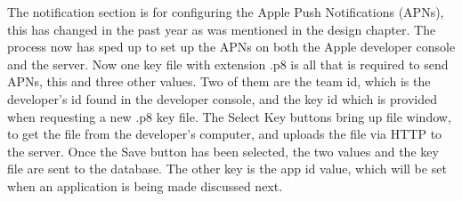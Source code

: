 The notification section is for configuring the Apple Push Notifications (APNs), this has changed in the past year as was mentioned in the design chapter. The process now has sped up to set up the APNs on both the Apple developer console and the server. Now one key file with extension .p8 is all that is required to send APNs, this and three other values. Two of them are the team id, which is the developer's id found in the developer console, and the key id which is provided when requesting a new .p8 key file. The Select Key buttons bring up file window, to get the file from the developer's computer, and uploads the file via HTTP to the server. Once the Save button has been selected, the two values and the key file are sent to the database. The other key is the app id value, which will be set when an application is being made discussed next.


